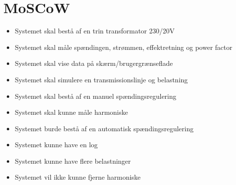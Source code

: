 
\section{MoSCoW}

\begin{itemize}
\item{Systemet skal bestå af en trin transformator 230/20V}
\item{Systemet skal måle spændingen, strømmen, effektretning og power factor}
\item{Systemet skal vise data på skærm/brugergrænseflade}
\item{Systemet skal simulere en transmissionslinje og belastning}
\item{Systemet skal bestå af en manuel spændingsregulering}
\item{Systemet skal kunne måle harmoniske}
\item{Systemet burde bestå af en automatisk spændingsregulering}
\item{Systemet kunne have en log}
\item{Systemet kunne have flere belastninger}
\item{Systemet vil ikke kunne fjerne harmoniske} 
\end{itemize}

